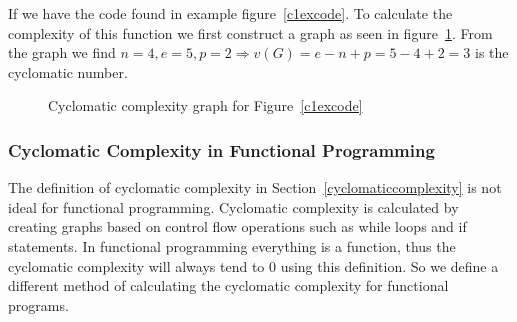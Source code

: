 \documentclass[12pt]{article}
\theoremstyle{definition}
\theoremstyle{theorem}
\begin{document}
If we have the code found in example figure~\ref{c1excode}. To calculate the
complexity of this function we first construct a graph as seen in
figure~\ref{fig:c1exgraph}. From the graph we find $n=4, e=5, p=2\Rightarrow
v(G)=e-n+p=5-4+2=3$ is the cyclomatic number.

\begin{figure}[H]
    \centering
    \caption{Cyclomatic complexity graph for Figure~\ref{c1excode}}\label{fig:c1exgraph}
\end{figure}

\subsubsection{Cyclomatic Complexity in Functional Programming}

The definition of cyclomatic complexity in Section~\ref{cyclomaticcomplexity} is
not ideal for functional programming. Cyclomatic complexity is calculated by
creating graphs based on control flow operations such as while loops and if
statements. In functional programming everything is a function, thus the
cyclomatic complexity will always tend to 0 using this definition. So we define
a different method of calculating the cyclomatic complexity for functional
programs. 
\end{document}
